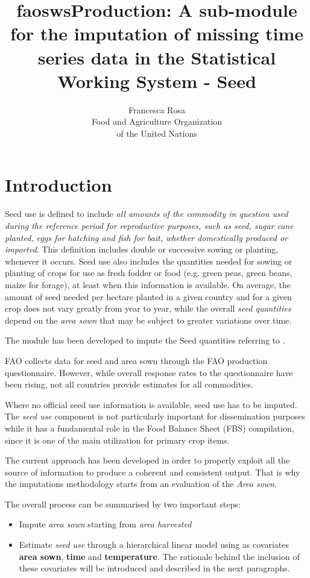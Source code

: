 \documentclass[nojss]{jss}
\title{\bf faoswsProduction: A sub-module for the imputation of missing time
series data in the Statistical Working System - Seed }
\author{Francesca Rosa\\ Food and Agriculture
    Organization \\ of the United Nations\\}
\begin{document}

\SwaveParseOpstions


\section {Introduction}

Seed use is defined to include \textit{all amounts of the commodity in question used during the reference period for reproductive purposes, such as seed, sugar cane planted, eggs for hatching and fish for bait, whether domestically produced or imported}. This definition includes double or successive sowing or planting, whenever it occurs. Seed use also includes the quantities needed for sowing or planting of crops for use as fresh fodder or food (e.g. green peas, green beans, maize for forage), at least when this information is available. On average, the amount of seed needed per hectare planted in a given country and for a given crop does not vary greatly from year to year, while the overall \textit{seed quantities} depend on the \textit{area sown} that may be subject to greater variations over time. 

The module has been developed to impute the Seed quantities referring to .

FAO collects data for seed and area sown through the FAO production questionnaire. However, while overall response rates to the questionnaire have been rising, not all countries provide estimates for all commodities.  

Where no official seed use information is available, seed use has to be imputed. The \textit{seed use} component is not particularly important for dissemination purposes while it has a fundamental role in the Food Balance Sheet (FBS) compilation, since it is one of the main utilization  for primary crop items.

The current approach has been developed in order to properly exploit all the source of information to produce a coherent and consistent output. That is why the imputations methodology starts from an evaluation of the \textit{Area sown}. 

The overall process can be summarised by two important steps:

\begin{itemize}

\item	Impute \textit{area sown} starting from \textit{area harvested}
\item	Estimate \textit{seed use} through a hierarchical linear model using as covariates \textbf{area sown}, \textbf{time} and \textbf{temperature}. The rationale behind the inclusion of these covariates will be introduced and described in the next paragraphs.

\end{itemize}
\end{document}
